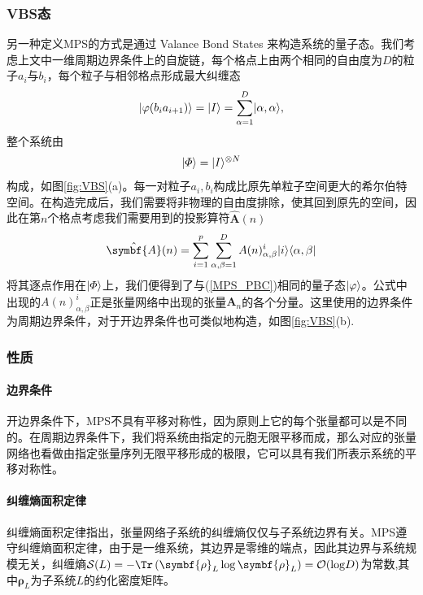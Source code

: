 \subsubsection{VBS态}
另一种定义MPS的方式是通过 Valance Bond States \cite[8]{dongZhangLiangWangLuoSuanFaCongBoSeZiXiTongDaoFeiMiZiXiTong2017}来构造系统的量子态。我们考虑上文中一维周期边界条件上的自旋链，每个格点上由两个相同的自由度为$D$的粒子$a_i$与$b_i$，每个粒子与相邻格点形成最大纠缠态
\begin{equation}
\lvert\varphi(b_i a_{i+1})\rangle = \lvert I\rangle = \sum_{\alpha=1}^D \lvert\alpha,\alpha\rangle,
\end{equation}
整个系统由
\begin{equation}
\lvert\varPhi\rangle = \lvert I\rangle^{\otimes N}
\end{equation}
构成，如图\ref{fig:VBS}(a)。每一对粒子$a_i,b_i$构成比原先单粒子空间更大的希尔伯特空间。在构造完成后，我们需要将非物理的自由度排除，使其回到原先的空间，因此在第$n$个格点考虑我们需要用到的投影算符$\hat{\symbf{A}}(n)$
\begin{equation}
\hat{\symbf{A}}(n) = \sum_{i=1}^p\sum_{\alpha,\beta=1}^D {A}(n)^i_{\alpha,\beta}\ket{i}\bra{\alpha,\beta}
\end{equation}
将其逐点作用在$\lvert\varPhi\rangle$上\cite[16]{bridgemanHandwavingInterpretiveDance2017}，我们便得到了与(\ref{MPS_PBC})相同的量子态$\lvert\varphi\rangle$。公式中出现的$A(n)^i_{\alpha,\beta}$正是张量网络中出现的张量$\symbf{A}_n$的各个分量。这里使用的边界条件为周期边界条件，对于开边界条件也可类似地构造，如图\ref{fig:VBS}(b).
\subsubsection{性质}

\paragraph{边界条件}

开边界条件下，MPS不具有平移对称性，因为原则上它的每个张量都可以是不同的。在周期边界条件下，我们将系统由指定的元胞无限平移而成，那么对应的张量网络也看做由指定张量序列无限平移形成的极限，它可以具有我们所表示系统的平移对称性。

\paragraph{纠缠熵面积定律}

纠缠熵面积定律指出，张量网络子系统的纠缠熵仅仅与子系统边界有关。MPS遵守纠缠熵面积定律，由于是一维系统，其边界是零维的端点，因此其边界与系统规模无关，纠缠熵$\mathcal{S}(L)=-\Tr\left(\symbf{\rho}_L\log\symbf{\rho}_L\right)=\mathcal{O}(\log\! D)$为常数\cite{PracticalIntroductionTensor2014},其中$\symbf{\rho}_L$为子系统$L$的约化密度矩阵。

